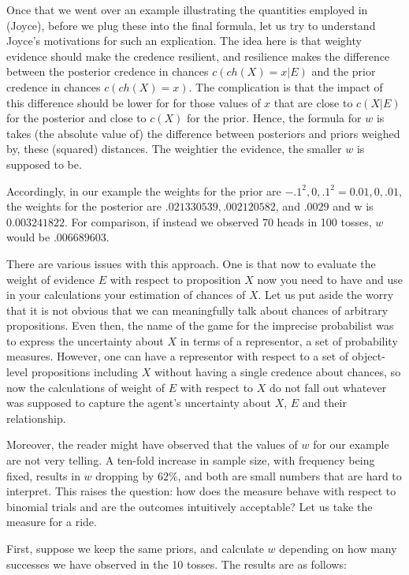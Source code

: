 \documentclass[
  10pt,
  dvipsnames,enabledeprecatedfontcommands]{scrartcl}
\begin{document}
Once that we went over an example illustrating the quantities employed
in (Joyce), before we plug these into the final formula, let us try to
understand Joyce's motivations for such an explication. The idea here is
that weighty evidence should make the credence resilient, and resilience
makes the difference between the posterior credence in chances
\(c(ch(X)=x \vert E)\) and the prior credence in chances \(c(ch(X)=x)\).
The complication is that the impact of this difference should be lower
for for those values of \(x\) that are close to \(c(X\vert E)\) for the
posterior and close to \(c(X)\) for the prior. Hence, the formula for
\(w\) is takes (the absolute value of) the difference between posteriors
and priors weighed by, these (squared) distances. The weightier the
evidence, the smaller \(w\) is supposed to be.

Accordingly, in our example the weights for the prior are
\(-.1^2, 0, .1^2 = 0.01, 0, .01\), the weights for the posterior are
\(.021330539, .002120582\), and \(.0029\) and w is \(0.003241822\). For
comparison, if instead we observed 70 heads in 100 tosses, \(w\) would
be \(.006689603\).

There are various issues with this approach. One is that now to evaluate
the weight of evidence \(E\) with respect to proposition \(X\) now you
need to have and use in your calculations your estimation of chances of
\(X\). Let us put aside the worry that it is not obvious that we can
meaningfully talk about chances of arbitrary propositions. Even then,
the name of the game for the imprecise probabilist was to express the
uncertainty about \(X\) in terms of a representor, a set of probability
measures. However, one can have a representor with respect to a set of
object-level propositions including \(X\) without having a single
credence about chances, so now the calculations of weight of \(E\) with
respect to \(X\) do not fall out whatever was supposed to capture the
agent's uncertainty about \(X\), \(E\) and their relationship.

Moreover, the reader might have observed that the values of \(w\) for
our example are not very telling. A ten-fold increase in sample size,
with frequency being fixed, results in \(w\) dropping by \(62\%\), and
both are small numbers that are hard to interpret. This raises the
question: how does the measure behave with respect to binomial trials
and are the outcomes intuitively acceptable? Let us take the measure for
a ride.

First, suppose we keep the same priors, and calculate \(w\) depending on
how many successes we have observed in the 10 tosses. The results are as
follows:
\end{document}
